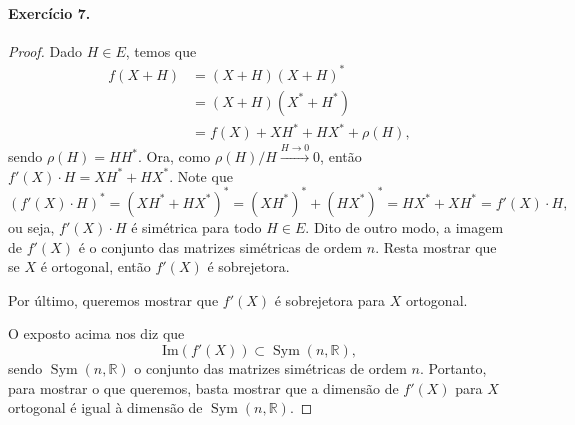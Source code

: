 \documentclass[12pt,a4paper]{article}
\DeclareMathOperator{\Sym}{Sym}
\newcommand{\R}{\mathbb{R}}
\renewcommand{\Im}{\mathrm{Im}}
\begin{document}
\paragraph{Exercício 7.}
    \begin{proof}
        Dado $H\in E$, temos que
        \begin{align*}
            f(X+H) &= (X+H)(X+H)^* \\
                   &= (X+H)(X^* + H^*) \\
                   &= f(X) + XH^* + HX^* + \rho(H),
        \end{align*}
        sendo $\rho(H) = HH^*$. Ora, como $\rho(H)/H \xrightarrow{H\to 0} 0$, então $f'(X)\cdot H = XH^* + HX^*$.
        Note que
        \begin{equation*}
            (f'(X)\cdot H)^* = (XH^* + HX^*)^* = (XH^*)^* + (HX^*)^* = HX^* + XH^* = f'(X)\cdot H,
        \end{equation*}
        ou seja, $f'(X)\cdot H$ é simétrica para todo $H\in E$. Dito de outro modo, a imagem de $f'(X)$
        é o conjunto das matrizes simétricas de ordem $n$. Resta mostrar que se $X$ é ortogonal, então
        $f'(X)$ é sobrejetora.
        
        Por último, queremos mostrar que $f'(X)$ é sobrejetora para $X$ ortogonal. 
        
        O exposto acima nos diz que
        \begin{equation*}
            \Im(f'(X)) \subset \Sym(n,\R),
        \end{equation*}
        sendo $\Sym(n,\R)$ o conjunto das matrizes simétricas de ordem $n$. Portanto, para mostrar
        o que queremos, basta mostrar que a dimensão de $f'(X)$ para $X$ ortogonal é igual à 
        dimensão de $\Sym(n,\R)$.
        

\end{proof}
\end{document}
